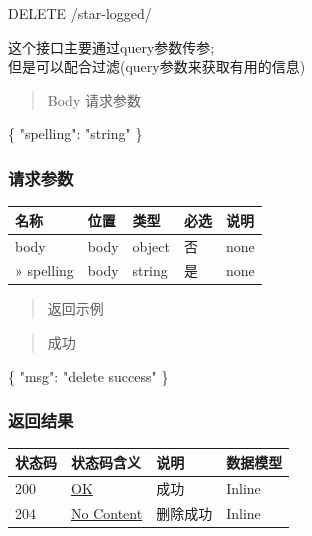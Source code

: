\documentclass[
]{article}
\newenvironment{Shaded}{}{}
\newcommand{\DataTypeTok}[1]{\textcolor[rgb]{0.56,0.13,0.00}{#1}}
\newcommand{\FunctionTok}[1]{\textcolor[rgb]{0.02,0.16,0.49}{#1}}
\newcommand{\StringTok}[1]{\textcolor[rgb]{0.25,0.44,0.63}{#1}}
\begin{document}
DELETE /star-logged/

这个接口主要通过query参数传参;\\
但是可以配合过滤(query参数来获取有用的信息)

\begin{quote}
Body 请求参数
\end{quote}

\begin{Shaded}
\begin{Highlighting}[]
\FunctionTok{\{}
  \DataTypeTok{"spelling"}\FunctionTok{:} \StringTok{"string"}
\FunctionTok{\}}
\end{Highlighting}
\end{Shaded}

\hypertarget{ux8bf7ux6c42ux53c2ux6570-28}{%
\subsubsection{请求参数}\label{ux8bf7ux6c42ux53c2ux6570-28}}

\begin{longtable}[]{@{}lllll@{}}
\toprule
名称 & 位置 & 类型 & 必选 & 说明 \\
\midrule
\endhead
body & body & object & 否 & none \\
» spelling & body & string & 是 & none \\
\bottomrule
\end{longtable}

\begin{quote}
返回示例
\end{quote}

\begin{quote}
成功
\end{quote}

\begin{Shaded}
\begin{Highlighting}[]
\FunctionTok{\{}
  \DataTypeTok{"msg"}\FunctionTok{:} \StringTok{"delete success"}
\FunctionTok{\}}
\end{Highlighting}
\end{Shaded}

\hypertarget{ux8fd4ux56deux7ed3ux679c-30}{%
\subsubsection{返回结果}\label{ux8fd4ux56deux7ed3ux679c-30}}

\begin{longtable}[]{@{}llll@{}}
\toprule
状态码 & 状态码含义 & 说明 & 数据模型 \\
\midrule
\endhead
200 & \href{https://tools.ietf.org/html/rfc7231\#section-6.3.1}{OK} &
成功 & Inline \\
204 & \href{https://tools.ietf.org/html/rfc7231\#section-6.3.5}{No
Content} & 删除成功 & Inline \\
\bottomrule
\end{longtable}
\end{document}
